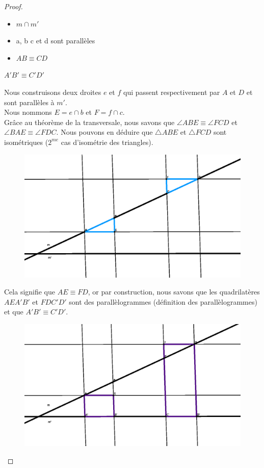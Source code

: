 \documentclass[a4paper,12pt]{article}
\begin{document}
\begin{proof}
\begin{hyp}
\begin{itemize}
    \item $m \cap m'$
    \item a, b c et d sont parallèles
    \item $AB \equiv CD$
\end{itemize}
\end{hyp}
\begin{concl}
$A'B' \equiv C'D'$
\end{concl}
Nous construisons deux droites $e$ et $f$ qui passent respectivement par $A$ et $D$ et sont parallèles à $m'$.\\
Nous nommons $E = e \cap b$ et $F = f \cap c$.\\
Grâce au théorème de la transversale, nous savons que $\angle ABE \equiv \angle FCD$ et $\angle BAE \equiv \angle FDC$. Nous pouvons en déduire que $\triangle ABE$ et $\triangle FCD$ sont isométriques ($2^{me}$ cas d'isométrie des triangles).\\
\begin{figure}[H]
        \centering
        \includegraphics[scale=0.2]{semblable2.2.eps}
    \end{figure}

Cela signifie que $AE \equiv FD$, or par construction, nous savons que  les quadrilatères $AEA'B'$ et $FDC'D'$ sont des parallèlogrammes (définition des parallèlogrammes) et que $A'B' \equiv C'D'$.
\begin{figure}[H]
        \centering
        \includegraphics[scale=0.2]{semblable2.3.eps}
    \end{figure}
    
\end{proof}
\end{document}
